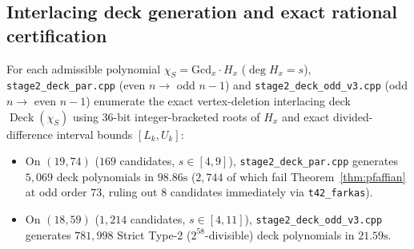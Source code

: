 \documentclass[11pt,reqno]{amsart}
\theoremstyle{definition}
\theoremstyle{remark}
\numberwithin{equation}{section}
\numberwithin{table}{section}
\DeclareMathOperator{\Deck}{Deck}
\begin{document}
\subsection{Interlacing deck generation and exact rational certification}
For each admissible polynomial $\chi_S = \mathrm{Gcd}_x \cdot H_x$ ($\deg H_x = s$), \nolinkurl{stage2_deck_par.cpp} (even $n \to$ odd $n-1$) and \nolinkurl{stage2_deck_odd_v3.cpp} (odd $n \to$ even $n-1$) enumerate the exact vertex-deletion interlacing deck $\Deck(\chi_S)$ using 36-bit integer-bracketed roots of $H_x$ and exact divided-difference interval bounds $[L_k, U_k]$:
\begin{itemize}
  \item On $(19, 74)$ ($169$ candidates, $s \in [4, 9]$), \nolinkurl{stage2_deck_par.cpp} generates $5{,}069$ deck polynomials in $98.86\text{s}$ ($2{,}744$ of which fail Theorem~\ref{thm:pfaffian} at odd order $73$, ruling out $8$ candidates immediately via \texttt{t42\_farkas}).
  \item On $(18, 59)$ ($1{,}214$ candidates, $s \in [4, 11]$), \nolinkurl{stage2_deck_odd_v3.cpp} generates $781{,}998$ Strict Type-2 ($2^{58}$-divisible) deck polynomials in $21.59\text{s}$.
\end{itemize}
\end{document}
